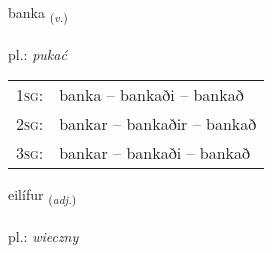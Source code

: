 \documentclass[frontgrid, backgrid]{flacards}\usepackage[]{graphicx}\usepackage[]{xcolor}
\begin{document}
\renewcommand{\blhead}{\vskip5pt {\small\bfseries\footnotesize Sagnorð | czasownik }}
\renewcommand{\bcfoot}{\vskip5pt \hspace{2pt}{\small\bfseries\footnotesize 3K}}


{banka \small{\textsubscript{(\textit{v.})}} \\[1ex] %
\textphonetic{[pauŋ̥ka]} \\
pl.: \emph{pukać} \\  [2ex]
\renewcommand*{\arraystretch}{0.8}
\begin{tabular}{p{1cm}l}
\textsc{1sg}: & banka -- bankaði -- bankað \\ 
\textsc{2sg}: & bankar -- bankaðir -- bankað \\ 
\textsc{3sg}: & bankar -- bankaði -- bankað \\ 
\end{tabular}
}

\renewcommand{\flhead}{\vskip5pt \fboxsep=0pt {\small\bfseries\footnotesize Lýsingarorð | przymiotnik}}
\renewcommand{\fcfoot}{\vskip5pt \fboxsep=0pt \hspace{2pt}{\small\bfseries\footnotesize 3K}}

\renewcommand{\blhead}{\vskip5pt {\small\bfseries\footnotesize Lýsingarorð | przymiotnik }}
\renewcommand{\bcfoot}{\vskip5pt \hspace{2pt}{\small\bfseries\footnotesize 3K}}


{eilífur \small{\textsubscript{(\textit{adj.})}} \\[1ex] %
\textphonetic{[eiːlivʏr]} \\
pl.: \emph{wieczny} \\  [2ex]
\renewcommand*{\arraystretch}{0.8}
}
\end{document}
